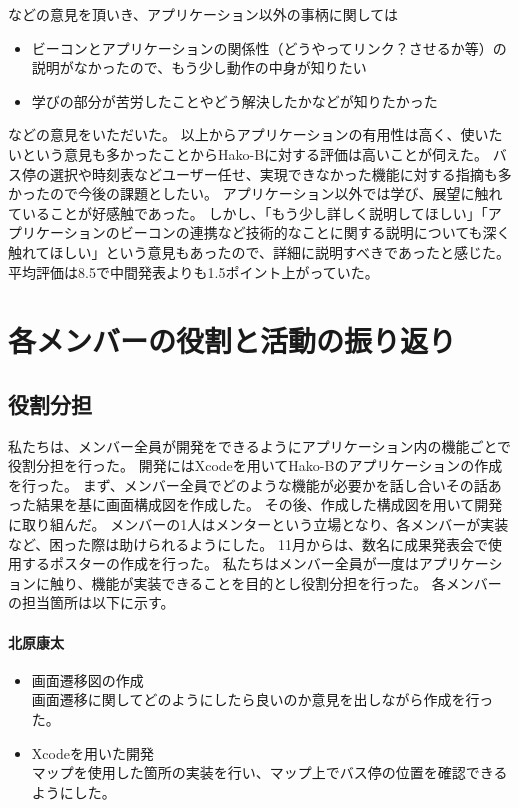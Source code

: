 \documentclass[openany,11pt,papersize]{jsbook}
\begin{document}
などの意見を頂いき、アプリケーション以外の事柄に関しては
\begin{itemize}

\item ビーコンとアプリケーションの関係性（どうやってリンク？させるか等）の説明がなかったので、もう少し動作の中身が知りたい
\item 学びの部分が苦労したことやどう解決したかなどが知りたかった

\end{itemize}
などの意見をいただいた。
以上からアプリケーションの有用性は高く、使いたいという意見も多かったことからHako-Bに対する評価は高いことが伺えた。
バス停の選択や時刻表などユーザー任せ、実現できなかった機能に対する指摘も多かったので今後の課題としたい。
アプリケーション以外では学び、展望に触れていることが好感触であった。
しかし、「もう少し詳しく説明してほしい」「アプリケーションのビーコンの連携など技術的なことに関する説明についても深く触れてほしい」という意見もあったので、詳細に説明すべきであったと感じた。
平均評価は8.5で中間発表よりも1.5ポイント上がっていた。



\chapter{各メンバーの役割と活動の振り返り}
\section{役割分担}
私たちは、メンバー全員が開発をできるようにアプリケーション内の機能ごとで役割分担を行った。
開発にはXcodeを用いてHako-Bのアプリケーションの作成を行った。
まず、メンバー全員でどのような機能が必要かを話し合いその話あった結果を基に画面構成図を作成した。
その後、作成した構成図を用いて開発に取り組んだ。
メンバーの1人はメンターという立場となり、各メンバーが実装など、困った際は助けられるようにした。
11月からは、数名に成果発表会で使用するポスターの作成を行った。
私たちはメンバー全員が一度はアプリケーションに触り、機能が実装できることを目的とし役割分担を行った。
各メンバーの担当箇所は以下に示す。

\subsubsection{北原康太}
\begin{itemize}
  \item 画面遷移図の作成\\
    画面遷移に関してどのようにしたら良いのか意見を出しながら作成を行った。
	\item Xcodeを用いた開発\\
    マップを使用した箇所の実装を行い、マップ上でバス停の位置を確認できるようにした。
\end{itemize}
\end{document}
